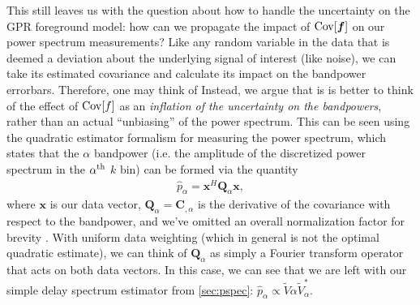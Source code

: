 \documentclass[a4paper,fleqn,usenatbib]{mnras}
\def\f{\boldsymbol{f}}
\def\x{\boldsymbol{x}}
\def\Q{\boldsymbol{Q}}
\def\C{\boldsymbol{C}}
\def\Cov{{\rm Cov}}
\begin{document}
This still leaves us with the question about how to handle the uncertainty on the GPR foreground model: how can we propagate the impact of $\Cov[\f]$ on our power spectrum measurements?
Like any random variable in the data that is deemed a deviation about the underlying signal of interest (like noise), we can take its estimated covariance and calculate its impact on the bandpower errorbars.
Therefore, one may think of
Instead, we argue that is is better to think of the effect of $\Cov[f]$ as an \emph{inflation of the uncertainty on the bandpowers}, rather than an actual ``unbiasing'' of the power spectrum.
This can be seen using the quadratic estimator formalism for measuring the power spectrum, which states that the $\alpha$ bandpower (i.e. the amplitude of the discretized power spectrum in the $\alpha^{\rm th}$ $k$ bin) can be formed via the quantity
\begin{align}
\label{eq:qe}
\hat{p}_\alpha = \x^H\Q_\alpha\x,
\end{align}
where $\x$ is our data vector, $\Q_\alpha = \C_{,\alpha}$ is the derivative of the covariance with respect to the bandpower, and we've omitted an overall normalization factor for brevity \citep{Tegmark1997, Liu2014a}.
With uniform data weighting (which in general is not the optimal quadratic estimate), we can think of $\Q_\alpha$ as simply a Fourier transform operator that acts on both data vectors.
In this case, we can see that we are left with our simple delay spectrum estimator from \autoref{sec:pspec}: $\hat{p}_\alpha \propto \widetilde{V}\alpha\widetilde{V}_\alpha^\ast$.
\end{document}
